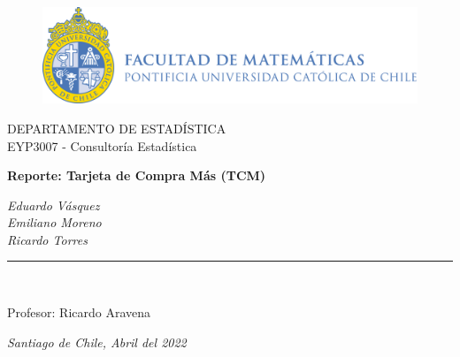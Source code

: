 \begin{titlepage}
\begin{center}

\vspace*{-0.7in}
\begin{figure}[htb]
\begin{center}
\includegraphics[width=12cm]{logo}
\end{center}
\end{figure}
\Large DEPARTAMENTO DE ESTADÍSTICA\\

\Large EYP3007 - Consultoría Estadística\\
\vspace*{1.5in}



\begin{large}


\Huge \textbf{Reporte: Tarjeta de Compra Más (TCM)} \\
\end{large}
\vspace*{2.5in}


\vspace*{0.3in}
\begin{large}
\textit{Eduardo Vásquez}\\
\textit{Emiliano Moreno}\\
\textit{Ricardo Torres}\\
\end{large}
\vspace*{0.5in}
\rule{80mm}{0.1mm}\\
\vspace*{0.1in}
\begin{large}
Profesor: Ricardo Aravena \\
\vspace*{0.5in}



\textit{Santiago de Chile, Abril del 2022}
\end{large}
\end{center}
\end{titlepage}